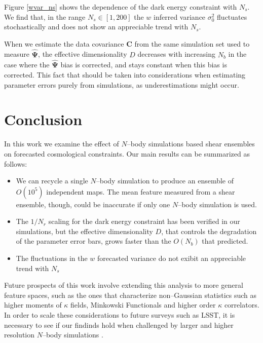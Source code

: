 \documentclass[reprint,aps,prd,superscriptaddress,showkeys,showpacs]{revtex4-1}
\newcommand{\bb}[1]{\mathbf{#1}}
\newcommand{\bbh}[1]{\mathbf{\hat{#1}}}
\begin{document}
Figure \ref{wvar_ns} shows the dependence of the dark energy constraint with $N_s$. We find that, in the range $N_s\in[1,200]$ the $w$ inferred variance $\sigma_0^2$ fluctuates stochastically and does not show an appreciable trend with $N_s$. 



When we estimate the data covariance $\bb{C}$ from the same simulation set used to measure $\bbh{\Psi}$, the effective dimensionality $D$ decreases with increasing $N_b$ in the case where the $\bbh{\Psi}$ bias is corrected, and stays constant when this bias is corrected. This fact that should be taken into considerations when estimating parameter errors purely from simulations, as underestimations might occur. 


\section{Conclusion}

In this work we examine the effect of $N$--body simulations based shear ensembles on forecasted cosmological constraints. Our main results can be summarized as follows:

\begin{itemize}
\item We can recycle a single $N$--body simulation to produce an ensemble of $O(10^5)$ independent maps. The mean feature measured from a shear ensemble, though, could be inaccurate if only one $N$--body simulation is used.  
\item The $1/N_r$ scaling for the dark energy constraint has been verified in our simulations, but the effective dimensionality $D$, that controls the degradation of the parameter error bars, grows faster than the $O(N_b)$ that \citep{DodelsonSchneider13} predicted. 
\item The fluctuations in the $w$ forecasted variance do not exibit an appreciable trend with $N_s$ 
\end{itemize}
%
Future prospects of this work involve extending this analysis to more general feature spaces, such as the ones that characterize non--Gaussian statistics such as higher moments of $\kappa$ fields, Minkowski Functionals and higher order $\kappa$ correlators. In order to scale these considerations to future surveys such as LSST, it is necessary to see if our findinds hold when challenged by larger and higher resolution $N$--body simulations \citep{Qcontinuum}.   
\end{document}
